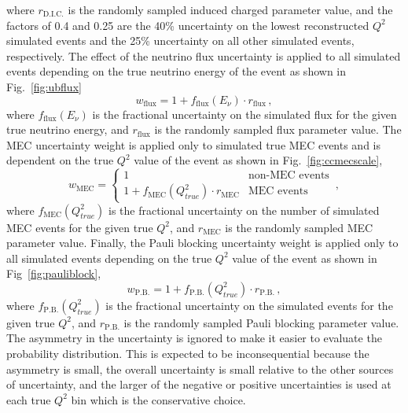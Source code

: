     where $r_{\textrm{D.I.C.}}$ is the randomly sampled induced charged
    parameter value, and the factors of 0.4 and 0.25 are the 40\% uncertainty
    on the lowest reconstructed $Q^2$ simulated events and the 25\% uncertainty
    on all other simulated events, respectively. The effect of the neutrino
    flux uncertainty is applied to all simulated events depending on the true
    neutrino energy of the event as shown in Fig.~\ref{fig:ubflux}
    \begin{equation}
      w_{\textrm{flux}} = 1 + f_{\textrm{flux}}(E_{\nu})\cdot r_{\textrm{flux}} \,,
    \end{equation}
    where $f_{\textrm{flux}}(E_{\nu})$ is the fractional uncertainty on the
    simulated flux for the given true neutrino energy, and $r_{\textrm{flux}}$
    is the randomly sampled flux parameter value. The MEC uncertainty weight is
    applied only to simulated true MEC events and is dependent on the true
    $Q^2$ value of the event as shown in Fig.~\ref{fig:ccmecscale},
    \begin{equation}
      w_{\textrm{MEC}} = 
      \begin{cases}
        1 &\textrm{non-MEC events} \\
        1 + f_{\textrm{MEC}}(Q^2_{true})\cdot r_{\textrm{MEC}}  &\textrm{MEC events}
      \end{cases} \,,
    \end{equation}
    where $f_{\textrm{MEC}}(Q^2_{true})$  is the fractional uncertainty on the
    number of simulated MEC events for the given true $Q^2$, and
    $r_{\textrm{MEC}}$ is the randomly sampled MEC parameter value. Finally,
    the Pauli blocking uncertainty weight is applied only to all simulated
    events depending on the true $Q^2$ value of the event as shown in
    Fig~\ref{fig:pauliblock},
    \begin{equation}
      w_{\textrm{P.B.}} = 1 + f_{\textrm{P.B.}}(Q^2_{true})\cdot r_{\textrm{P.B.}} \,,
    \end{equation}
    where $f_{\textrm{P.B.}}(Q^2_{true})$ is the fractional uncertainty on the
    simulated events for the given true $Q^2$, and $r_{\textrm{P.B.}}$ is the
    randomly sampled Pauli blocking parameter value.  The asymmetry in the
    uncertainty is ignored to make it easier to evaluate the probability
    distribution. This is expected to be inconsequential because the asymmetry
    is small, the overall uncertainty is small relative to the other sources of
    uncertainty, and the larger of the negative or positive uncertainties is
    used at each true $Q^2$ bin which is the conservative choice.

